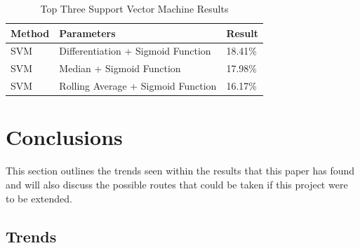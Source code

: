 \documentclass[conference]{IEEEtran}
\begin{document}
\begin{table}
\centering
\begin{tabu}{ |p{4cm}|p{4cm}|p{4cm}|}\hline\hline
Method & Parameters & Result \\ \hline
SVM & Differentiation + Sigmoid Function & 18.41\% \\ \hline
SVM & Median + Sigmoid Function & 17.98\% \\ \hline
SVM & Rolling Average + Sigmoid Function & 16.17\% \\ \hline
\end{tabu}
\vspace{2 mm}
\caption{Top Three Support Vector Machine Results}
\label{fig: Table SVM Results}
\end{table}

\section{Conclusions}

This section outlines the trends seen within the results that this paper has found and will also discuss the possible routes that could be taken if this project were to be extended.

\subsection{Trends}
\end{document}
